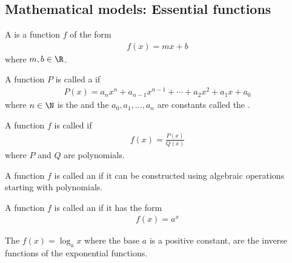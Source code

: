 \documentclass{article}
\begin{document}
\subsection{Mathematical models: Essential functions}
\begin{definition}
    A  is a function $f$ of the form
    \begin{align*}
        f(x) = mx + b
    \end{align*}
    where $m, b\in\R$.
\end{definition}
\begin{definition}
    A function $P$ is called a  if
    \begin{align*}
        P(x) = a_nx^n+a_{n-1}x^{n-1}+\cdots +a_2x^2 + a_1x+a_0
    \end{align*}
    where $n\in\N$ is the  and the $a_0, a_1, ..., a_n$ are constants called the .
\end{definition}
\begin{definition}
    A function $f$ is called  if
    \begin{align*}
        f(x) = \frac{P(x)}{Q(x)}
    \end{align*}
    where $P$ and $Q$ are polynomials.
\end{definition}
\begin{definition}
    A function $f$ is called an  if it can be constructed using algebraic operations starting with polynomials.
\end{definition}
\begin{definition}
    A function $f$ is called an  if it has the form
    \begin{align*}
        f(x) = a^x
    \end{align*}
\end{definition}
\begin{definition}
    The  $f(x) = \log_ax$ where the base $a$ is a positive constant, are the inverse functions of the exponential functions.
\end{definition}
\end{document}
